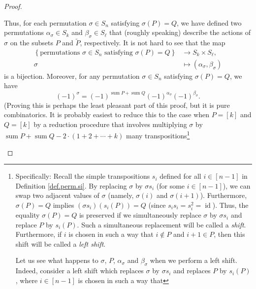 \begin{proof}
\begin{fineprint}
Thus, for each permutation $\sigma\in S_{n}$ satisfying $\sigma\left(
P\right)  =Q$, we have defined two permutations $\alpha_{\sigma}\in S_{k}$ and
$\beta_{\sigma}\in S_{\ell}$ that (roughly speaking) describe the actions of
$\sigma$ on the subsets $P$ and $\widetilde{P}$, respectively. It is not hard
to see that the map%
\begin{align*}
\left\{  \text{permutations }\sigma\in S_{n}\text{ satisfying }\sigma\left(
P\right)  =Q\right\}   &  \rightarrow S_{k}\times S_{\ell},\\
\sigma &  \mapsto\left(  \alpha_{\sigma},\beta_{\sigma}\right)
\end{align*}
is a bijection. Moreover, for any permutation $\sigma\in S_{n}$ satisfying
$\sigma\left(  P\right)  =Q$, we have
\begin{equation}
\left(  -1\right)  ^{\sigma}=\left(  -1\right)  ^{\operatorname*{sum}%
P+\operatorname*{sum}Q}\left(  -1\right)  ^{\alpha_{\sigma}}\left(  -1\right)
^{\beta_{\sigma}}. \label{pf.thm.det.det(A+B).signs-equal}%
\end{equation}
(Proving this is perhaps the least pleasant part of this proof, but it is pure
combinatorics. It is probably easiest to reduce this to the case when
$P=\left[  k\right]  $ and $Q=\left[  k\right]  $ by a reduction procedure
that involves multiplying $\sigma$ by $\operatorname*{sum}%
P+\operatorname*{sum}Q-2\cdot\left(  1+2+\cdots+k\right)  $ many
transpositions\footnote{Specifically: Recall the simple transpositions $s_{i}$
defined for all $i\in\left[  n-1\right]  $ in Definition \ref{def.perm.si}. By
replacing $\sigma$ by $\sigma s_{i}$ (for some $i\in\left[  n-1\right]  $), we
can swap two adjacent values of $\sigma$ (namely, $\sigma\left(  i\right)  $
and $\sigma\left(  i+1\right)  $). Furthermore, $\sigma\left(  P\right)  =Q$
implies $\left(  \sigma s_{i}\right)  \left(  s_{i}\left(  P\right)  \right)
=Q$ (since $s_{i}s_{i}=s_{i}^{2}=\operatorname*{id}$). Thus, the equality
$\sigma\left(  P\right)  =Q$ is preserved if we simultaneously replace
$\sigma$ by $\sigma s_{i}$ and replace $P$ by $s_{i}\left(  P\right)  $. Such
a simultaneous replacement will be called a \emph{shift}. Furthermore, if $i$
is chosen in such a way that $i\notin P$ and $i+1\in P$, then this shift will
be called a \emph{left shift}.
\par
Let us see what happens to $\sigma$, $P$, $\alpha_{\sigma}$ and $\beta
_{\sigma}$ when we perform a left shift. Indeed, consider a left shift which
replaces $\sigma$ by $\sigma s_{i}$ and replaces $P$ by $s_{i}\left(
P\right)  $, where $i\in\left[  n-1\right]  $ is chosen in such a way that
}
\end{fineprint}
\end{proof}
